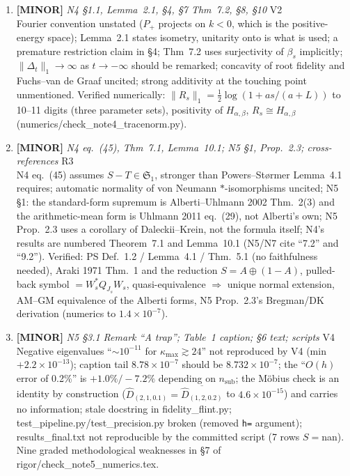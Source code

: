 \documentclass[11pt]{article}
\begin{document}
\begin{enumerate}[leftmargin=1.6em,itemsep=6pt]
\item \textbf{[MINOR]} \emph{N4 \S1.1, Lemma~2.1, \S4, \S7 Thm~7.2, \S8, \S10} \hfill\textsc{V2}\\ Fourier convention unstated (\(P_+\) projects on \(k<0\), which is the positive-energy space); Lemma~2.1 states isometry, unitarity onto is what is used; a premature restriction claim in \S4; Thm~7.2 uses surjectivity of \(\beta_s\) implicitly; \(\|\Delta_t\|_1\to\infty\) as \(t\to-\infty\) should be remarked; concavity of root fidelity and Fuchs--van de Graaf uncited; strong additivity at the touching point unmentioned. Verified numerically: \(\|R_s\|_1=\tfrac12\log(1+as/(a+L))\) to 10--11 digits (three parameter sets), positivity of \(H_{\alpha,\beta}\), \(R_s\cong H_{\alpha,\beta}\) (numerics/check\_note4\_tracenorm.py).
\item \textbf{[MINOR]} \emph{N4 eq.~(45), Thm~7.1, Lemma~10.1; N5 \S1, Prop.~2.3; cross-references} \hfill\textsc{R3}\\ N4 eq.~(45) assumes \(S-T\in\mathfrak S_1\), stronger than Powers--St\o rmer Lemma~4.1 requires; automatic normality of von Neumann \(*\)-isomorphisms uncited; N5 \S1: the standard-form supremum is Alberti--Uhlmann 2002 Thm.~2(3) and the arithmetic-mean form is Uhlmann 2011 eq.~(29), not Alberti's own; N5 Prop.~2.3 uses a corollary of Daleckii--Krein, not the formula itself; N4's results are numbered Theorem~7.1 and Lemma~10.1 (N5/N7 cite ``7.2'' and ``9.2''). Verified: PS Def.~1.2 / Lemma~4.1 / Thm.~5.1 (no faithfulness needed), Araki 1971 Thm.~1 and the reduction \(S=A\oplus(1-A)\), pulled-back symbol \(=W_s^*Q_{J_s}W_s\), quasi-equivalence \(\Rightarrow\) unique normal extension, AM--GM equivalence of the Alberti forms, N5 Prop.~2.3's Bregman/DK derivation (numerics to \(1.4\times10^{-7}\)).
\item \textbf{[MINOR]} \emph{N5 \S3.1 Remark ``A trap''; Table~1 caption; \S6 text; scripts} \hfill\textsc{V4}\\ Negative eigenvalues ``\(\sim10^{-11}\) for \(\kappa_{\max}\gtrsim24\)'' not reproduced by V4 (min \(+2.2\times10^{-13}\)); caption tail \(8.78\times10^{-7}\) should be \(8.732\times10^{-7}\); the ``\(O(h)\) error of 0.2\%'' is \(+1.0\%/-7.2\%\) depending on \(n_{\mathrm{sub}}\); the M\"obius check is an identity by construction (\(\widehat D_{(2,1,0.1)}=\overline{\widehat D_{(1,2,0.2)}}\) to \(4.6\times10^{-15}\)) and carries no information; stale docstring in fidelity\_flint.py; test\_pipeline.py/test\_precision.py broken (removed \texttt{h=} argument); results\_final.txt not reproducible by the committed script (7 rows \(S=\)nan). Nine graded methodological weaknesses in \S7 of rigor/check\_note5\_numerics.tex.

\end{enumerate}
\end{document}
